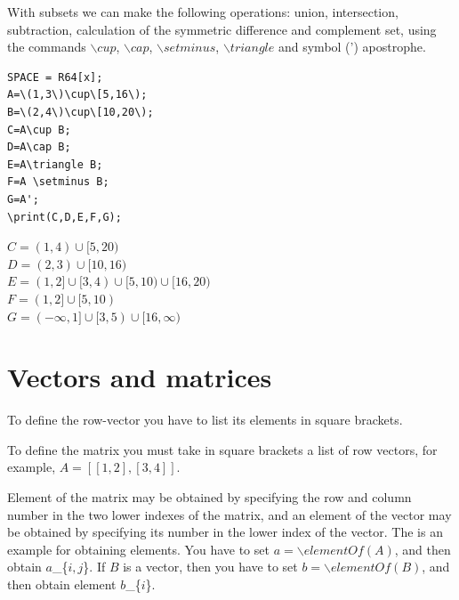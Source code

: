  

With subsets we can make the following operations: union, intersection, subtraction, calculation of 
the symmetric difference and complement set, using the commands $\backslash cup$, 
$\backslash cap$, $\backslash setminus$, $\backslash triangle$ and symbol  (') apostrophe.

 
 
\begin{verbatim}
SPACE = R64[x];
A=\(1,3\)\cup\[5,16\);
B=\(2,4\)\cup\[10,20\);
C=A\cup B;
D=A\cap B;
E=A\triangle B;
F=A \setminus B;
G=A';
\print(C,D,E,F,G);
\end{verbatim}

\ex{ $SPACE=R64[x]; $\\
$ A=(1,3)\cup[5,16);$\\
$B=(2,4)\cup[10,20);$\\
$C=A\cup B;$\\
$D=A\cap B;$\\
$E=A\triangle B;$\\
$F=A \setminus B;$\\
$G=A';$\\
$print(C,D,E,F,G);$}
{$C = (1,4)\cup[5,20)$\\
 $D = (2,3)\cup[10,16)$\\
 $E = (1,2]\cup[3,4)\cup[5,10)\cup[16,20)$\\
 $F = (1,2]\cup[5,10)$\\
 $G = (-\infty,1]\cup[3,5)\cup[16,\infty)$}


\newpage
\section{Vectors and matrices}
To define the row-vector you have to list its elements in square brackets. 

To define the matrix you must take in square brackets a list of row vectors, for example, $ A = [[1, 2], [3, 4]] $.

Element of the matrix may be obtained by specifying the row and column number in the two lower indexes of the matrix,
and an element of the vector may be obtained by specifying its number in the lower index of the vector.
The is an example for obtaining elements. You have to set $a=\backslash elementOf(A)$, and then obtain $a$\_\{$i, j$\}.  If $B$ is a vector, then you have to set $b=\backslash elementOf(B)$, and then obtain element $b$\_\{$i$\}.  
 
